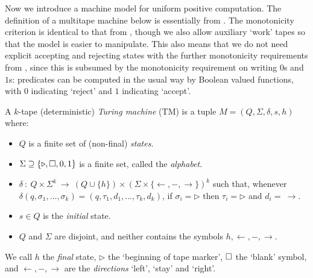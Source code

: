 \documentclass{lmcs}
\begin{document}
Now we introduce a machine model for uniform positive computation. The definition of a multitape machine below is essentially from \cite{Papadimitriou07}. The monotonicity criterion is identical to that from \cite{LautemannSS96:on-pos-p,LSS98}, though we also allow auxiliary `work' tapes so that the model is easier to manipulate. This also means that we do not need explicit accepting and rejecting states with the further monotonicity requirements from \cite{LautemannSS96:on-pos-p,LSS98}, since this is subsumed by the monotonicity requirement on writing $0$s and $1$s: predicates can be computed in the usual way by Boolean valued functions, with $0$ indicating `reject' and $1$ indicating `accept'.



\begin{definition}
	A $k$-tape (deterministic) \emph{Turing machine} (TM) is a tuple $M = ( Q, \Sigma,   \delta, s, h)$ where:
	\begin{itemize}
		\item $Q$ is a finite set of (non-final) \emph{states}.
		\item $\Sigma \supseteq \{\triangleright, \square, 0,1\}$ is a finite set, called the \emph{alphabet}.
		\item $\delta \ :\  Q \times \Sigma^k \ \to \ ( Q \cup \{h\} )\times (\Sigma \times \{\leftarrow , - , \rightarrow \} )^k$ such that, whenever $\delta (q, \sigma_1 , \dots , \sigma_k ) =  (q, \tau_1 , d_1 , \dots , \tau_k , d_k )$, if $\sigma_i = \triangleright$ then $\tau_i  = \triangleright$ and $d_i =\  \rightarrow$.
		\item $s \in Q$ is the \emph{initial} state.
		\item $Q$ and $\Sigma $ are disjoint, and neither contains the symbols $h, \leftarrow, - , \rightarrow$.
	\end{itemize} 
%	
\smallskip
We call $h$ the \emph{final} state, $\triangleright$ the `beginning of tape marker', $\square$ the `blank' symbol, and $\leftarrow, - , \rightarrow$ are the \emph{directions} `{left}', `{stay}' and `{right}'.



\end{definition}
\end{document}
